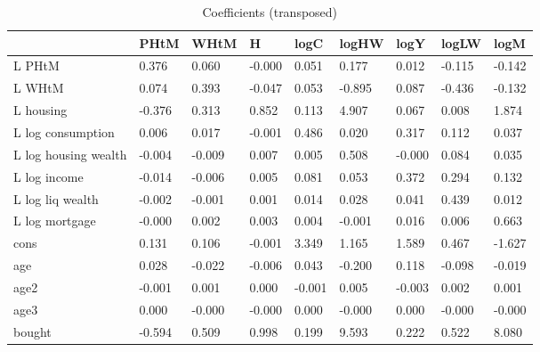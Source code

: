 \begin{table}[htbp]
\caption{\label{clabel} Coefficients (transposed)}\centering\medskip
\begin{tabular}{lllllllll} \hline \hline
 & PHtM  & WHtM  & H  & logC  & logHW  & logY  & logLW  & logM  \\  \hline 
L PHtM &     0.376 &     0.060 &    -0.000 &     0.051 &     0.177 &     0.012 &    -0.115 &    -0.142 \\  
L WHtM &     0.074 &     0.393 &    -0.047 &     0.053 &    -0.895 &     0.087 &    -0.436 &    -0.132 \\  
L housing &    -0.376 &     0.313 &     0.852 &     0.113 &     4.907 &     0.067 &     0.008 &     1.874 \\  
L log consumption &     0.006 &     0.017 &    -0.001 &     0.486 &     0.020 &     0.317 &     0.112 &     0.037 \\  
L log housing wealth &    -0.004 &    -0.009 &     0.007 &     0.005 &     0.508 &    -0.000 &     0.084 &     0.035 \\  
L log income &    -0.014 &    -0.006 &     0.005 &     0.081 &     0.053 &     0.372 &     0.294 &     0.132 \\  
L log liq wealth &    -0.002 &    -0.001 &     0.001 &     0.014 &     0.028 &     0.041 &     0.439 &     0.012 \\  
L log mortgage &    -0.000 &     0.002 &     0.003 &     0.004 &    -0.001 &     0.016 &     0.006 &     0.663 \\  
cons &     0.131 &     0.106 &    -0.001 &     3.349 &     1.165 &     1.589 &     0.467 &    -1.627 \\  
age &     0.028 &    -0.022 &    -0.006 &     0.043 &    -0.200 &     0.118 &    -0.098 &    -0.019 \\  
age2 &    -0.001 &     0.001 &     0.000 &    -0.001 &     0.005 &    -0.003 &     0.002 &     0.001 \\  
age3 &     0.000 &    -0.000 &    -0.000 &     0.000 &    -0.000 &     0.000 &    -0.000 &    -0.000 \\  
bought &    -0.594 &     0.509 &     0.998 &     0.199 &     9.593 &     0.222 &     0.522 &     8.080 \\  
\hline \hline \end{tabular}
\end{table}
